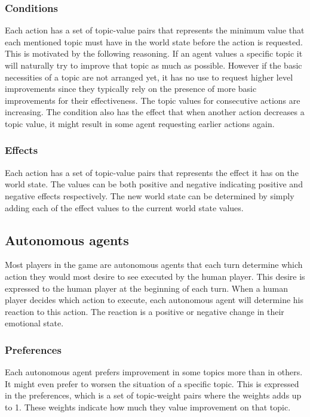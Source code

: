 \documentclass[11pt,a4paper]{article}
\begin{document}
    \subsubsection{Conditions}
      Each action has a set of topic-value pairs that represents the minimum value that each mentioned topic must have in the world state before the action is requested. This is motivated by the following reasoning. If an agent values a specific topic it will naturally try to improve that topic as much as possible. However if the basic necessities of a topic are not arranged yet, it has no use to request higher level improvements since they typically rely on the presence of more basic improvements for their effectiveness. The topic values for consecutive actions are increasing. The condition also has the effect that when another action decreases a topic value, it might result in some agent requesting earlier actions again.
    \subsubsection{Effects}
      Each action has a set of topic-value pairs that represents the effect it has on the world state. The values can be both positive and negative indicating positive and negative effects respectively. The new world state can be determined by simply adding each of the effect values to the current world state values.
  \subsection{Autonomous agents}
    Most players in the game are autonomous agents that each turn determine which action they would most desire to see executed by the human player. This desire is expressed to the human player at the beginning of each turn. When a human player decides which action to execute, each autonomous agent will determine his reaction to this action. The reaction is a positive or negative change in their emotional state.
    \subsubsection{Preferences}
      Each autonomous agent prefers improvement in some topics more than in others. It might even prefer to worsen the situation of a specific topic. This is expressed in the preferences, which is a set of topic-weight pairs where the weights adds up to 1. These weights indicate how much they value improvement on that topic.
\end{document}
